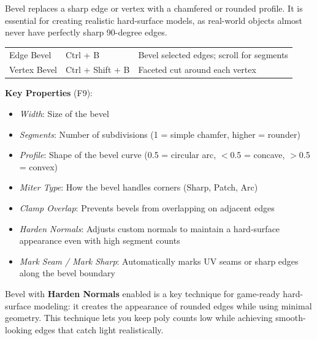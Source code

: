 Bevel replaces a sharp edge or vertex with a chamfered or rounded profile. It is essential for creating realistic hard-surface models, as real-world objects almost never have perfectly sharp 90-degree edges.

\begin{shortcutbox}
\begin{center}
\begin{tabularx}{\textwidth}{L{4cm}C{3.5cm}X}
\toprule
{}
 &  &  \\
\midrule
Edge Bevel & Ctrl + B & Bevel selected edges; scroll for segments \\
Vertex Bevel & Ctrl + Shift + B & Faceted cut around each vertex \\
\bottomrule
\end{tabularx}
\end{center}
\end{shortcutbox}

\textbf{Key Properties} (F9):
\begin{itemize}[leftmargin=2em]
  \item \textit{Width}: Size of the bevel
  \item \textit{Segments}: Number of subdivisions (1 = simple chamfer, higher = rounder)
  \item \textit{Profile}: Shape of the bevel curve (0.5 = circular arc, $<$0.5 = concave, $>$0.5 = convex)
  \item \textit{Miter Type}: How the bevel handles corners (Sharp, Patch, Arc)
  \item \textit{Clamp Overlap}: Prevents bevels from overlapping on adjacent edges
  \item \textit{Harden Normals}: Adjusts custom normals to maintain a hard-surface appearance even with high segment counts
  \item \textit{Mark Seam / Mark Sharp}: Automatically marks UV seams or sharp edges along the bevel boundary
\end{itemize}

\begin{tipbox}
Bevel with \textbf{Harden Normals} enabled is a key technique for game-ready hard-surface modeling: it creates the appearance of rounded edges while using minimal geometry. This technique lets you keep poly counts low while achieving smooth-looking edges that catch light realistically.
\end{tipbox}

